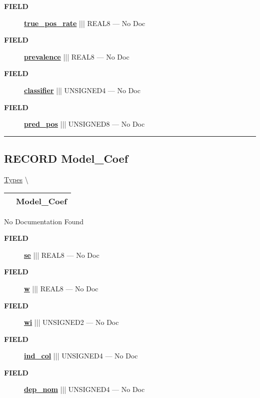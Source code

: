 \begin{description}
\item [\colorbox{tagtype}{\color{white} \textbf{\textsf{FIELD}}}] \textbf{\underline{true\_pos\_rate}} ||| REAL8 --- No Doc
\item [\colorbox{tagtype}{\color{white} \textbf{\textsf{FIELD}}}] \textbf{\underline{prevalence}} ||| REAL8 --- No Doc
\item [\colorbox{tagtype}{\color{white} \textbf{\textsf{FIELD}}}] \textbf{\underline{classifier}} ||| UNSIGNED4 --- No Doc
\item [\colorbox{tagtype}{\color{white} \textbf{\textsf{FIELD}}}] \textbf{\underline{pred\_pos}} ||| UNSIGNED8 --- No Doc
\end{description}





\rule{\linewidth}{0.5pt}
\subsection*{\textsf{\colorbox{headtoc}{\color{white} RECORD}
Model\_Coef}}

\hypertarget{ecldoc:logisticregression.types.model_coef}{}
\hspace{0pt} \hyperlink{ecldoc:LogisticRegression.Types}{Types} \textbackslash 

{\renewcommand{\arraystretch}{1.5}
\begin{tabularx}{\textwidth}{|>{\raggedright\arraybackslash}l|X|}
\hline
\hspace{0pt}\mytexttt{\color{red} } & \textbf{Model\_Coef} \\
\hline
\end{tabularx}
}

\par





No Documentation Found







\par
\begin{description}
\item [\colorbox{tagtype}{\color{white} \textbf{\textsf{FIELD}}}] \textbf{\underline{se}} ||| REAL8 --- No Doc
\item [\colorbox{tagtype}{\color{white} \textbf{\textsf{FIELD}}}] \textbf{\underline{w}} ||| REAL8 --- No Doc
\item [\colorbox{tagtype}{\color{white} \textbf{\textsf{FIELD}}}] \textbf{\underline{wi}} ||| UNSIGNED2 --- No Doc
\item [\colorbox{tagtype}{\color{white} \textbf{\textsf{FIELD}}}] \textbf{\underline{ind\_col}} ||| UNSIGNED4 --- No Doc
\item [\colorbox{tagtype}{\color{white} \textbf{\textsf{FIELD}}}] \textbf{\underline{dep\_nom}} ||| UNSIGNED4 --- No Doc
\end{description}





